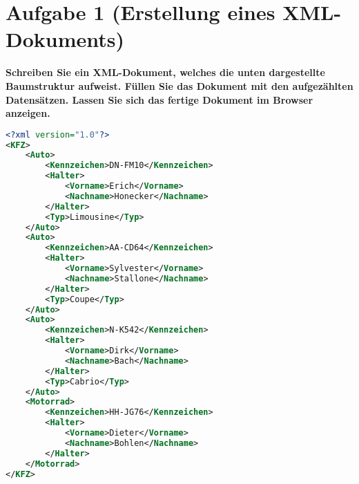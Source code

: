 \section{Aufgabe 1 (Erstellung eines XML-Dokuments)}
\textbf{Schreiben Sie ein XML-Dokument, welches die unten dargestellte Baumstruktur aufweist.
Füllen Sie das Dokument mit den aufgezählten Datensätzen. Lassen Sie sich das fertige
Dokument im Browser anzeigen.}

\begin{lstlisting}[language=xml, caption={XML-Datei},
label={lst:xml}]
<?xml version="1.0"?>
<KFZ>
    <Auto>
        <Kennzeichen>DN-FM10</Kennzeichen>
        <Halter>
            <Vorname>Erich</Vorname>
            <Nachname>Honecker</Nachname>
        </Halter>
        <Typ>Limousine</Typ>
    </Auto>
    <Auto>
        <Kennzeichen>AA-CD64</Kennzeichen>
        <Halter>
            <Vorname>Sylvester</Vorname>
            <Nachname>Stallone</Nachname>
        </Halter>
        <Typ>Coupe</Typ>
    </Auto>
    <Auto>
        <Kennzeichen>N-K542</Kennzeichen>
        <Halter>
            <Vorname>Dirk</Vorname>
            <Nachname>Bach</Nachname>
        </Halter>
        <Typ>Cabrio</Typ>
    </Auto>
    <Motorrad>
        <Kennzeichen>HH-JG76</Kennzeichen>
        <Halter>
            <Vorname>Dieter</Vorname>
            <Nachname>Bohlen</Nachname>
        </Halter>
    </Motorrad>
</KFZ>
\end{lstlisting}


\clearpage 